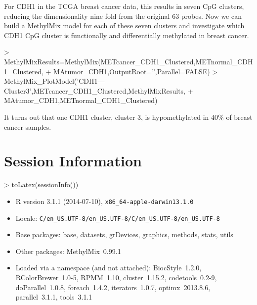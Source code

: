 \documentclass[11pt]{article}
\begin{document}
For CDH1 in the TCGA breast cancer data, this results in seven CpG clusters, 
reducing the dimensionality nine fold from the original 63 probes. Now we can 
build a MethylMix model for each of these seven clusters and investigate which 
CDH1 CpG cluster is functionally and differentially methylated in breast cancer. 

\begin{Schunk}
\begin{Sinput}
> MethylMixResults=MethylMix(METcancer_CDH1_Clustered,METnormal_CDH1_Clustered,
+                            MAtumor_CDH1,OutputRoot='',Parallel=FALSE)
> MethylMix_PlotModel('CDH1---Cluster3',METcancer_CDH1_Clustered,MethylMixResults,
+                     MAtumor_CDH1,METnormal_CDH1_Clustered)
\end{Sinput}
\end{Schunk}

It turns out that one CDH1 cluster, cluster 3, is hypomethylated in 40\% of 
breast cancer samples. 

\section{Session Information}

\begin{Schunk}
\begin{Sinput}
> toLatex(sessionInfo())
\end{Sinput}
\begin{itemize}\raggedright
  \item R version 3.1.1 (2014-07-10), \verb|x86_64-apple-darwin13.1.0|
  \item Locale: \verb|C/en_US.UTF-8/en_US.UTF-8/C/en_US.UTF-8/en_US.UTF-8|
  \item Base packages: base, datasets, grDevices, graphics, methods, stats,
    utils
  \item Other packages: MethylMix~0.99.1
  \item Loaded via a namespace (and not attached): BiocStyle~1.2.0,
    RColorBrewer~1.0-5, RPMM~1.10, cluster~1.15.2, codetools~0.2-9,
    doParallel~1.0.8, foreach~1.4.2, iterators~1.0.7, optimx~2013.8.6,
    parallel~3.1.1, tools~3.1.1
\end{itemize}\end{Schunk}


\end{document}

